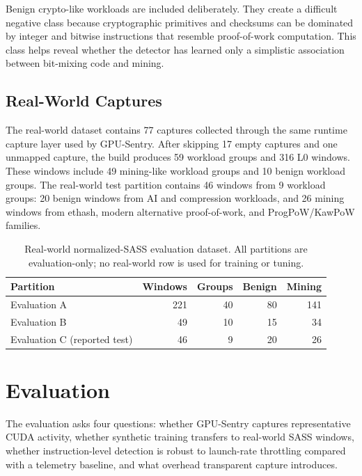 Benign crypto-like workloads are included deliberately. They create a difficult negative class because cryptographic primitives and checksums can be dominated by integer and bitwise instructions that resemble proof-of-work computation. This class helps reveal whether the detector has learned only a simplistic association between bit-mixing code and mining.

\subsection{Real-World Captures}

The real-world dataset contains 77 captures collected through the same runtime capture layer used by GPU-Sentry. After skipping 17 empty captures and one unmapped capture, the build produces 59 workload groups and 316 L0 windows. These windows include 49 mining-like workload groups and 10 benign workload groups. The real-world test partition contains 46 windows from 9 workload groups: 20 benign windows from AI and compression workloads, and 26 mining windows from ethash, modern alternative proof-of-work, and ProgPoW/KawPoW families.

\begin{table}[t]
    \centering
    \caption{Real-world normalized-SASS evaluation dataset. All partitions are evaluation-only; no real-world row is used for training or tuning.}
    \label{tab:realworld_dataset}
    \footnotesize
    \begin{tabular}{lrrrr}
        \toprule
        Partition & Windows & Groups & Benign & Mining \\
        \midrule
        Evaluation A & 221 & 40 & 80 & 141 \\
        Evaluation B & 49 & 10 & 15 & 34 \\
        Evaluation C (reported test) & 46 & 9 & 20 & 26 \\
        \bottomrule
    \end{tabular}
\end{table}

\section{Evaluation}
\label{sec:evaluation}

The evaluation asks four questions: whether GPU-Sentry captures representative CUDA activity, whether synthetic training transfers to real-world SASS windows, whether instruction-level detection is robust to launch-rate throttling compared with a telemetry baseline, and what overhead transparent capture introduces.

